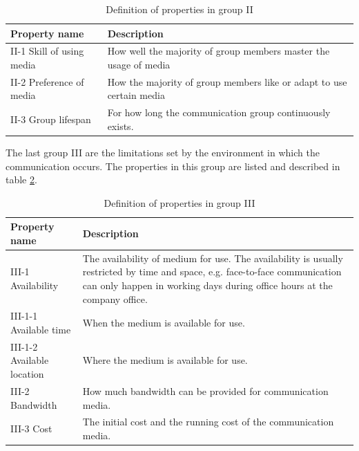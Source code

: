 \documentclass[english,12pt,a4paper,pdftex]{article}
\begin{document}
\begin{table}[!h]
\renewcommand{\arraystretch}{1.3}
\caption{Definition of properties in group II}
\label{table:mft_group2}
\centering
\begin{tabular}{|p{4cm}|p{10cm}|}
\hline
\textbf{Property name} & \textbf{Description}\\
\hline
II-1 Skill of using media & How well the majority of group members master the usage of media  \\
\hline
II-2 Preference of media & How the majority of group members like or adapt to use certain media \\
\hline
II-3 Group lifespan & For how long the communication group continuously exists. \\
\hline
\end{tabular}
\end{table}

The last group III are the limitations set by the environment in which the communication occurs. The properties in this group are listed and described in table \ref{table:mft_group3}.

\begin{table}[!h]
\renewcommand{\arraystretch}{1.3}
\caption{Definition of properties in group III}
\label{table:mft_group3}
\centering
\begin{tabular}{|p{4cm}|p{10cm}|}
\hline
\textbf{Property name} & \textbf{Description}\\
\hline
III-1 Availability & The availability of medium for use. The availability is usually restricted by time and space, e.g. face-to-face communication can only happen in working days during office hours at the company office. \\
\hline
III-1-1 Available time & When the medium is available for use. \\
\hline
III-1-2 Available location & Where the medium is available for use. \\
\hline
III-2 Bandwidth & How much bandwidth can be provided for communication media. \\
\hline
III-3 Cost & The initial cost and the running cost of the communication media. \\
\hline
\end{tabular}
\end{table}
\end{document}
